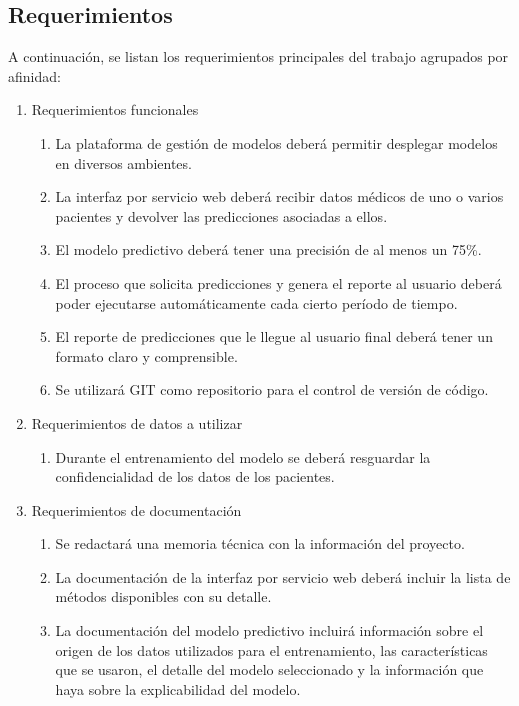 \subsection{Requerimientos}
A continuación, se listan los requerimientos principales del trabajo agrupados por afinidad:
\begin{enumerate}
	\item Requerimientos funcionales
		\begin{enumerate}
			\item La plataforma de gestión de modelos deberá permitir desplegar modelos en diversos ambientes.
			\item La interfaz por servicio web deberá recibir datos médicos de uno o varios pacientes y devolver las predicciones asociadas a ellos.			
			\item El modelo predictivo deberá tener una precisión de al menos un 75\%.
			\item El proceso que solicita predicciones y genera el reporte al usuario deberá poder ejecutarse automáticamente cada cierto período de tiempo.		
			\item El reporte de predicciones que le llegue al usuario final deberá tener un formato claro y comprensible.
			\item Se utilizará GIT como repositorio para el control de versión de código.
		\end{enumerate}
	\item Requerimientos de datos a utilizar
		\begin{enumerate}		
		\item Durante el entrenamiento del modelo se deberá resguardar la confidencialidad de los datos de los pacientes.		
		\end{enumerate}
	\item Requerimientos de documentación
		\begin{enumerate}
			\item Se redactará una memoria técnica con la información del proyecto.
			\item La documentación de la interfaz por servicio web deberá incluir la lista de métodos disponibles con su detalle.
			\item La documentación del modelo predictivo incluirá información sobre el origen de los datos utilizados para el entrenamiento, las características que se usaron, el detalle del modelo seleccionado y la información que haya sobre la explicabilidad del modelo.
		\end{enumerate}		
\end{enumerate}

